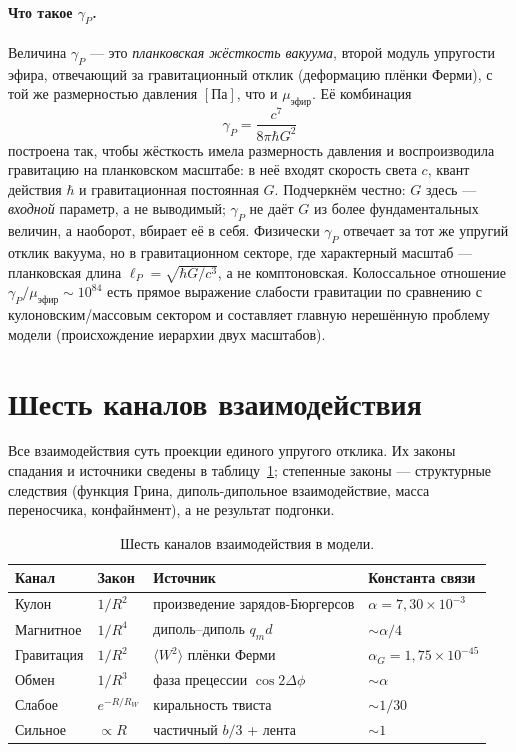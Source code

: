\documentclass[12pt,a4paper]{article}
\begin{document}
\paragraph{Что такое $\gamma_P$.}
Величина $\gamma_P$ --- это \emph{планковская жёсткость вакуума}, второй модуль
упругости эфира, отвечающий за гравитационный отклик (деформацию плёнки Ферми),
с той же размерностью давления $[\text{Па}]$, что и $\mu_{\text{эфир}}$. Её
комбинация
\begin{equation}
\gamma_P = \frac{c^7}{8\pi\hbar G^2}
\end{equation}
построена так, чтобы жёсткость имела размерность давления и воспроизводила
гравитацию на планковском масштабе: в неё входят скорость света $c$, квант
действия $\hbar$ и гравитационная постоянная $G$. Подчеркнём честно: $G$ здесь
--- \emph{входной} параметр, а не выводимый; $\gamma_P$ не даёт $G$ из более
фундаментальных величин, а наоборот, вбирает её в себя. Физически $\gamma_P$
отвечает за тот же упругий отклик вакуума, но в гравитационном секторе, где
характерный масштаб --- планковская длина $\ell_P=\sqrt{\hbar G/c^3}$, а не
комптоновская. Колоссальное отношение
$\gamma_P/\mu_{\text{эфир}}\sim10^{84}$ есть прямое выражение слабости
гравитации по сравнению с кулоновским/массовым сектором и составляет главную
нерешённую проблему модели (происхождение иерархии двух масштабов).

\section{Шесть каналов взаимодействия}
\label{sec:channels}
Все взаимодействия суть проекции единого упругого отклика. Их законы спадания и
источники сведены в таблицу~\ref{tab:channels}; степенные законы --- структурные
следствия (функция Грина, диполь-дипольное взаимодействие, масса переносчика,
конфайнмент), а не результат подгонки.

\begin{table}[h]
\centering
\caption{Шесть каналов взаимодействия в модели.}
\label{tab:channels}
\begin{tabular}{llll}
\toprule
Канал & Закон & Источник & Константа связи \\
\midrule
Кулон & $1/R^2$ & произведение зарядов-Бюргерсов & $\alpha=7{,}30\times10^{-3}$ \\
Магнитное & $1/R^4$ & диполь--диполь $q_m d$ & $\sim\alpha/4$ \\
Гравитация & $1/R^2$ & $\langle W^2\rangle$ плёнки Ферми & $\alpha_G=1{,}75\times10^{-45}$ \\
Обмен & $1/R^3$ & фаза прецессии $\cos2\Delta\phi$ & $\sim\alpha$ \\
Слабое & $e^{-R/R_W}$ & киральность твиста & $\sim 1/30$ \\
Сильное & $\propto R$ & частичный $b/3$ + лента & $\sim 1$ \\
\bottomrule
\end{tabular}
\end{table}
\end{document}
